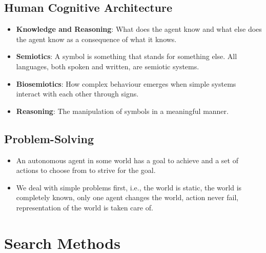 \documentclass[a4paper]{article}
\begin{document}
\subsection{Human Cognitive Architecture}
\begin{itemize}
    \item \textbf{Knowledge and Reasoning}: What does the agent know and what else does the agent know as a consequence of what it knows.
    \item \textbf{Semiotics}: A symbol is something that stands for something else. All languages, both spoken and written, are semiotic systems.
    \item \textbf{Biosemiotics}: How complex behaviour emerges when simple systems interact with each other through signs.
    \item \textbf{Reasoning}: The manipulation of symbols in a meaningful manner.
\end{itemize}

\subsection{Problem-Solving}
\begin{itemize}
    \item An autonomous agent in some world has a goal to achieve and a set of actions to choose from to strive for the goal.
    \item We deal with simple problems first, i.e., the world is static, the world is completely known, only one agent changes the world, action never fail, representation of the world is taken care of.
\end{itemize}

\section{Search Methods}
\end{document}
